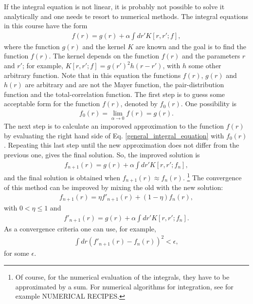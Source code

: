 
If the integral equation is not linear, it is probably not
possible to solve it analytically and one needs te resort to 
numerical methods.
The integral equations in this course have the form
\begin{align}\label{general_integral_equation}
f(r) = g(r) + \alpha \int dr' K[r,r';f],
\end{align}
where the function $g(r)$ and the kernel $K$ are known
and the goal is to find the function $f(r)$.
The kernel depends on the function $f(r)$ and the parameters $r$ and $r'$;
for example, $K[r,r';f] = g(r')^2 h(r-r')$, with $h$ some other arbitrary function.
Note that in this equation the functions $f(r)$, $g(r)$ and $h(r)$ are arbitrary and are not the Mayer function,
the pair-distribution function and the total-correlation function.
The first step is to guess some acceptable form for the 
function $f(r)$, denoted by $f_0(r)$.
One possibility is
\begin{align}
f_0(r) = \lim_{\alpha \to 0} f(r) = g(r).
\end{align}
The next step is to calculate an imporoved approximation
to the function $f(r)$ by evaluating the right hand side of
Eq. \eqref{general_integral_equation} with $f_0(r)$.
Repeating this last step until the new approximation does not
differ from the previous one, gives the final solution.
So, the improved solution is
\begin{align}
f_{n+1}(r) = g(r) + \alpha \int dr' K[r,r';f_n],
\end{align}
and the final solution is obtained when $f_{n+1}(r) \approx f_n(r)$.
\footnote{Of course, for the numerical evaluation of the integrals, they have to be approximated by a sum.
For numerical algorithms for integration, see for example
NUMERICAL RECIPES.}
The convergence of this method can be improved by mixing the old with the new solution:
\begin{align}
f_{n+1}(r) = \eta f'_{n+1}(r) + (1-\eta) f_n(r),
\end{align}
with $0 < \eta \leq 1$ and 
\begin{align}
f'_{n+1}(r) = g(r) + \alpha \int dr' K[r,r';f_n].
\end{align}
As a convergence criteria one can use, for example,
\begin{align}
\int dr \left( f'_{n+1}(r) - f_n(r) \right)^2 < \epsilon,
\end{align}
for some $\epsilon$.


